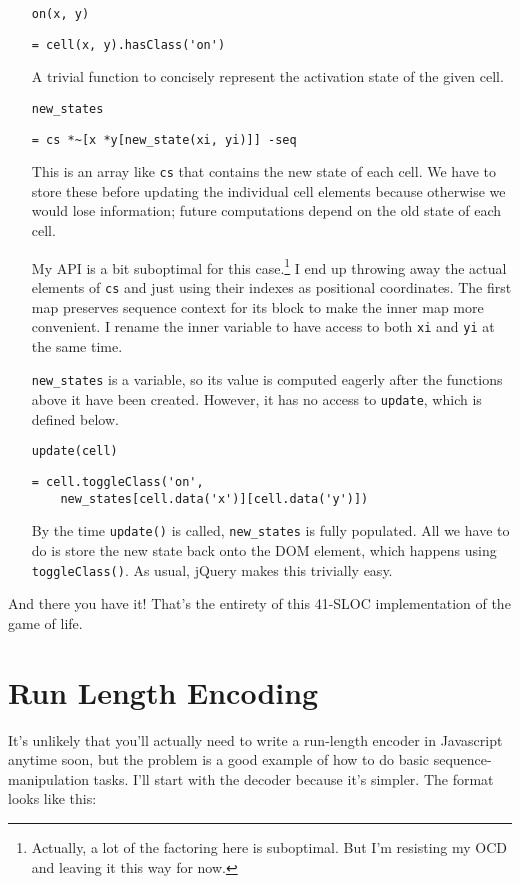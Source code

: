 \documentclass{report}
\begin{document}
\begin{enumerate}
\item[{\tt on(x, y)}]
\begin{verbatim}
= cell(x, y).hasClass('on')
\end{verbatim}

  A trivial function to concisely represent the activation state of the given cell.

\item[{\tt new\_states}]
\begin{verbatim}
= cs *~[x *y[new_state(xi, yi)]] -seq
\end{verbatim}

  This is an array like {\tt cs} that contains the new state of each cell. We have to store these before updating the individual cell elements because otherwise we would lose
  information; future computations depend on the old state of each cell.

  My API is a bit suboptimal for this case.\footnote{Actually, a lot of the factoring here is suboptimal. But I'm resisting my OCD and leaving it this way for now.} I end up throwing
  away the actual elements of {\tt cs} and just using their indexes as positional coordinates. The first map preserves sequence context for its block to make the inner map more
  convenient. I rename the inner variable to have access to both {\tt xi} and {\tt yi} at the same time.

  {\tt new\_states} is a variable, so its value is computed eagerly after the functions above it have been created. However, it has no access to {\tt update}, which is defined below.

\item[{\tt update(cell)}]
\begin{verbatim}
= cell.toggleClass('on',
    new_states[cell.data('x')][cell.data('y')])
\end{verbatim}

  By the time {\tt update()} is called, {\tt new\_states} is fully populated. All we have to do is store the new state back onto the DOM element, which happens using {\tt
  toggleClass()}. As usual, jQuery makes this trivially easy.
\end{enumerate}

      And there you have it! That's the entirety of this 41-SLOC implementation of the game of life.

\chapter{Run Length Encoding}
  It's unlikely that you'll actually need to write a run-length encoder in Javascript anytime soon, but the problem is a good example of how to do basic sequence-manipulation tasks. I'll start
  with the decoder because it's simpler. The format looks like this:
\end{document}
